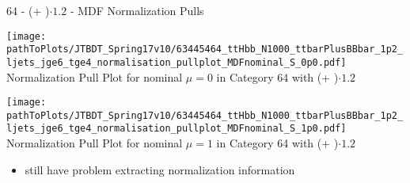\begin{frame}{64 - (\ttbar + \bbbar)$\cdot \num[round-precision=1]{1.2}$ - MDF Normalization Pulls}
\vskip -0.25cm

\begin{minipage}{0.4\textwidth}
\begin{center}
\texttt{[image: \\pathToPlots/JTBDT\_Spring17v10/63445464\_ttHbb\_N1000\_ttbarPlusBBbar\_1p2\_ljets\_jge6\_tge4\_normalisation\_pullplot\_MDFnominal\_S\_0p0.pdf]}\\
Normalization Pull Plot for nominal $\mu = 0$ in Category 64 with (\ttbar + \bbbar)$\cdot \num[round-precision=1]{1.2}$
\end{center}

\end{minipage}
\hfill
\begin{minipage}{0.4\textwidth}
\begin{center}
\texttt{[image: \\pathToPlots/JTBDT\_Spring17v10/63445464\_ttHbb\_N1000\_ttbarPlusBBbar\_1p2\_ljets\_jge6\_tge4\_normalisation\_pullplot\_MDFnominal\_S\_1p0.pdf]}\\
Normalization Pull Plot for nominal $\mu = 1$ in Category 64 with (\ttbar + \bbbar)$\cdot \num[round-precision=1]{1.2}$
\end{center}

\vskip -0.25cm


\end{minipage}

\begin{itemize}
\item still have problem extracting normalization information
\end{itemize}

\end{frame}
%
%
%
%
%
%
